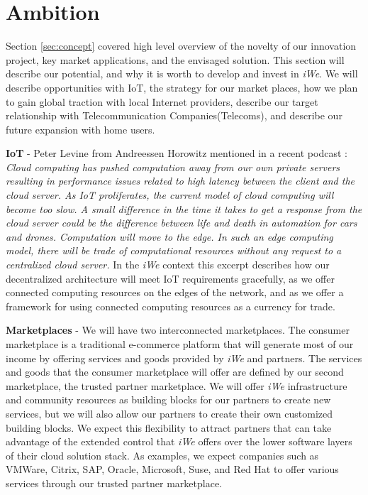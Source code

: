 \section{Ambition}
\label{sec:ambition}


Section \ref{sec:concept} covered high level overview of the novelty of our
innovation project, key market applications, and the envisaged solution. This
section will describe our potential, and why it is worth to develop and invest
in \textit{iWe}. We will describe opportunities with IoT, the strategy for
our market places, how we plan to gain global traction with local Internet
providers, describe our target relationship with Telecommunication
Companies(Telecoms), and describe our future expansion with home users.

\textbf{IoT} - Peter Levine from Andreessen Horowitz mentioned in a recent
podcast \cite{the-end}: \textit{Cloud computing has pushed computation away from
our own private servers resulting in performance issues related to high latency
between the client and the cloud server. As IoT proliferates, the current model
of cloud computing will become too slow. A small difference in the time it takes
to get a response from the cloud server could be the difference between life and
death in automation for cars and drones.  Computation will move to the edge. In
such an edge computing model, there will be trade of computational resources
without any request to a centralized cloud server.} In the \textit{iWe}
context this excerpt describes how our decentralized architecture will meet IoT
requirements gracefully, as we offer connected computing resources on the edges
of the network, and as we offer a framework for using connected computing
resources as a currency for trade.

\textbf{Marketplaces} - We will have two interconnected marketplaces. The
consumer marketplace is a traditional e-commerce platform that will generate
most of our income by offering services and goods provided by \textit{iWe}
and partners. The services and goods that the consumer marketplace will offer
are defined by our second marketplace, the trusted partner marketplace. We will
offer \textit{iWe} infrastructure and community resources as building blocks
for our partners to create new services, but we will also allow our partners to
create their own customized building blocks. We expect this flexibility to
attract partners that can take advantage of the extended control that
\textit{iWe} offers over the lower software layers of their cloud solution
stack.  As examples, we expect companies such as VMWare, Citrix, SAP, Oracle,
Microsoft, Suse, and Red Hat to offer various services through our trusted
partner marketplace.

